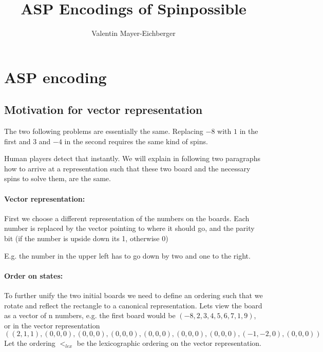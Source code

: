 \documentclass[]{llncs}
\author{Valentin Mayer-Eichberger}
\institute{IVU Traffice Technologies\\ Bundesallee 88, 12000 Berlin\\
\email{vme@ivu.de}}
\title{ASP Encodings of Spinpossible}
\newcommand{\spintable}[9]{ 
\node [matrix,ampersand replacement=\&,nodes={minimum size=4mm}]
{
    \node {#1}; \& \node{#2}; \& \node {#3}; \\ 
    \node {#4}; \& \node{#5}; \& \node {#6}; \\ 
    \node {#7}; \& \node{#8}; \& \node {#9}; \\ 
}; 
}
\begin{document}
 \maketitle

\section{ASP encoding}



\subsection{Motivation for vector representation}

The two following problems are essentially the same.
Replacing $-8$ with $1$ in the first and $3$ and $-4$ in the
second requires the same kind of spins. 


Human players detect that instantly. We will explain in
following two paragraphs how to arrive at a representation
such that these two board and the necessary spins to solve
them, are the same. 

\paragraph{Vector representation: } First we choose a
different representation of the numbers on the boards. Each
number is replaced by the vector pointing to where it should
go, and the parity bit (if the number is upside down its 1,
otherwise 0)


E.g. the number in the upper left has to go down by two and one to the right. 


\paragraph{Order on states: } To further unify the two initial boards we need to
define an ordering such that we rotate and reflect the rectangle to a canonical
representation. Lets view the board as a vector of n numbers, e.g. the first board
would be $(-8,2,3,4,5,6,7,1,9)$, or in the vector representation 
\[
((2,1,1),(0,0,0),(0,0,0),(0,0,0),(0,0,0),(0,0,0),(0,0,0),(-1,-2,0),(0,0,0)) 
\] 
Let the ordering $<_{lex}$ be the lexicographic ordering on the vector representation.
\end{document}
